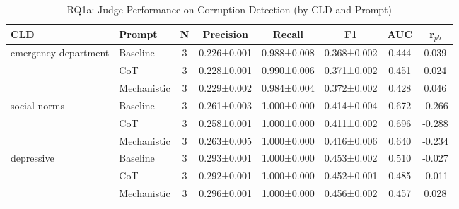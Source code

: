 \begin{table}[htbp]
\centreing
\caption{RQ1a: Judge Performance on Corruption Detection (by CLD and Prompt)}
\label{tab:rq1a_main}
\begin{tabular}{llcccccc}
\toprule
\textbf{CLD} & \textbf{Prompt} & \textbf{N} & \textbf{Precision} & \textbf{Recall} & \textbf{F1} & \textbf{AUC} & \textbf{r$_{pb}$} \\
\midrule
emergency department & Baseline & 3 & 0.226±0.001 & 0.988±0.008 & 0.368±0.002 & 0.444 & 0.039 \\
 & CoT & 3 & 0.228±0.001 & 0.990±0.006 & 0.371±0.002 & 0.451 & 0.024 \\
 & Mechanistic & 3 & 0.229±0.002 & 0.984±0.004 & 0.372±0.002 & 0.428 & 0.046 \\
\midrule
social norms & Baseline & 3 & 0.261±0.003 & 1.000±0.000 & 0.414±0.004 & 0.672 & -0.266 \\
 & CoT & 3 & 0.258±0.001 & 1.000±0.000 & 0.411±0.002 & 0.696 & -0.288 \\
 & Mechanistic & 3 & 0.263±0.005 & 1.000±0.000 & 0.416±0.006 & 0.640 & -0.234 \\
\midrule
depressive & Baseline & 3 & 0.293±0.001 & 1.000±0.000 & 0.453±0.002 & 0.510 & -0.027 \\
 & CoT & 3 & 0.292±0.001 & 1.000±0.000 & 0.452±0.001 & 0.485 & -0.011 \\
 & Mechanistic & 3 & 0.296±0.001 & 1.000±0.000 & 0.456±0.002 & 0.457 & 0.028 \\
\midrule
\bottomrule
\end{tabular}
\end{table}